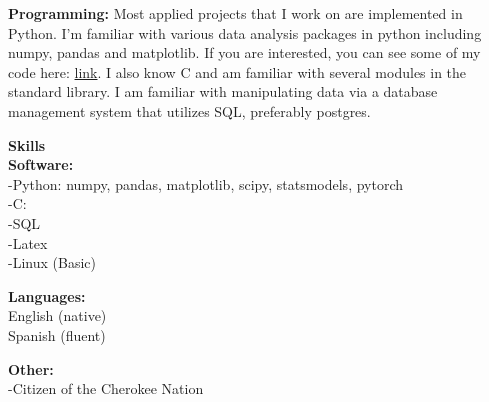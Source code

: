 \documentclass[12pt]{amsart}
\newcommand{\n}{\noindent}
\begin{document}
\n \textbf{Programming:} Most applied projects that I work on are implemented in Python. I'm familiar with various data analysis packages in python including numpy, pandas and matplotlib. If you are interested, you can see some of my code here: \textcolor{blue}{ \href{https://github.com/carsonaj/Programming}{link}}. I also know C and am familiar with several modules in the standard library. I am familiar with manipulating data via a database management system that utilizes SQL, preferably postgres. \vspace{2mm}

\smallskip \n \textbf{\large Skills}\vspace{2mm}\\
\n \textbf{Software:}\\
-Python: numpy, pandas, matplotlib, scipy, statsmodels, pytorch\\
-C:\\
-SQL\\
-Latex\\
-Linux (Basic)\vspace{2mm}


\n \textbf{Languages:}\\
English (native)\\
Spanish (fluent) \vspace{2mm}

\n \textbf{Other:}\\
-Citizen of the Cherokee Nation
\end{document}
